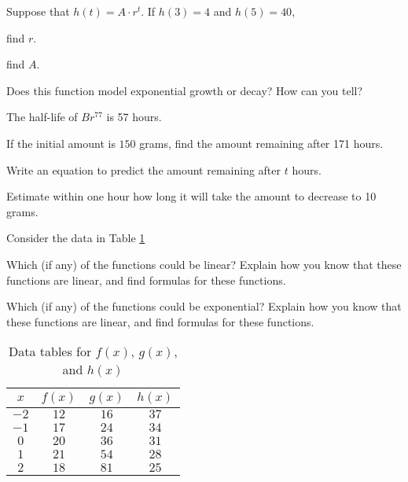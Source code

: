 \begin{exercises} 

\item Suppose that $h(t) = A \cdot r^t$.  If $h(3)=4$ and $h(5)=40$,
    \ba
        \item find $r$.
        \item find $A$.
        \item Does this function model exponential growth or decay? How can you tell?
    \ea
\begin{exerciseSolution}
\end{exerciseSolution}


\item The half-life of $Br^{77}$ is 57 hours.
    \ba
        \item If the initial amount is $150$ grams, find the amount remaining after 171
            hours.
        \item Write an equation to predict the amount remaining after $t$ hours.
        \item Estimate within one hour how long it will take the amount to decrease to 10
            grams.
    \ea
\begin{exerciseSolution}
\end{exerciseSolution}


\item Consider the data in Table \ref{tab:0.2.exercise3}
    \ba
        \item Which (if any) of the functions could be linear? Explain how you know that
            these functions are linear, and find formulas for these functions.
        \item Which (if any) of the functions could be exponential? Explain how you know
            that these functions are linear, and find formulas for these functions.
    \ea
    \begin{table}[h!]
        \centering
        \begin{tabular}{|c|c|c|c|}
            \hline
            $x$ & $f(x)$ & $g(x)$ & $h(x)$ \\ \hline
           $-2$&$12$&$16$&$37$\\
           $-1$&$17$&$24$&$34$\\
           $0 $&$20$&$36$&$31$\\
           $1 $&$21$&$54$&$28$\\
           $2 $&$18$&$81$&$25$\\ \hline
        \end{tabular}
        \caption{Data tables for $f(x)$, $g(x)$, and $h(x)$}
        \label{tab:0.2.exercise3}
    \end{table}
\begin{exerciseSolution}
\end{exerciseSolution}

\end{exercises}
\afterexercises
